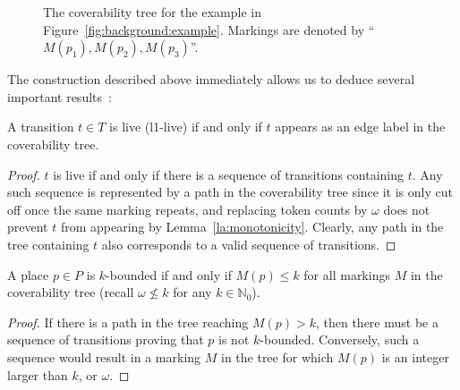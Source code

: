 \begin{figure}
	\centering
	\caption{The coverability tree for the example in Figure~\ref{fig:background:example}. Markings are denoted by ``$M(p_1),M(p_2),M(p_3)$''.}\label{fig:background:tree}
\end{figure}

The construction described above immediately allows us to deduce several important results~\cite{murata1989petri}:

\begin{theorem}
	A transition $t\in T$ is live (l1-live) if and only if $t$ appears as an edge label in the coverability tree.
\end{theorem}
\begin{proof}
	$t$ is live if and only if there is a sequence of transitions containing $t$. Any such sequence is represented by a path in the coverability tree since it is only cut off once the same marking repeats, and replacing token counts by $\omega$ does not prevent $t$ from appearing by Lemma~\ref{la:monotonicity}. Clearly, any path in the tree containing $t$ also corresponds to a valid sequence of transitions.
\end{proof}

\begin{theorem}
	A place $p\in P$ is $k$-bounded if and only if $M(p)\le k$ for all markings $M$ in the coverability tree (recall $\omega\nleq k$ for any $k\in\mathbb{N}_0$).
\end{theorem}
\begin{proof}
	If there is a path in the tree reaching $M(p)>k$, then there must be a sequence of transitions proving that $p$ is not $k$-bounded. Conversely, such a sequence would result in a marking $M$ in the tree for which $M(p)$ is an integer larger than $k$, or $\omega$.
\end{proof}

